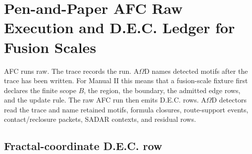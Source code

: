 \ifdefined\AODManualII
\section{Pen-and-Paper AFC Raw Execution and D.E.C. Ledger for Fusion Scales}
\label{sec:pen-paper-dec-ledger}

AFC runs raw. The trace records the run. A$\Omega$D names detected motifs after the trace has been written. For Manual II this means that a fusion-scale fixture first declares the finite scope $B$, the region, the boundary, the admitted edge rows, and the update rule. The raw AFC run then emits D.E.C. rows. A$\Omega$D detectors read the trace and name retained motifs, formula closures, route-support events, contact/reclosure packets, SADAR contexts, and residual rows.


\subsection{Fractal-coordinate D.E.C. row}

